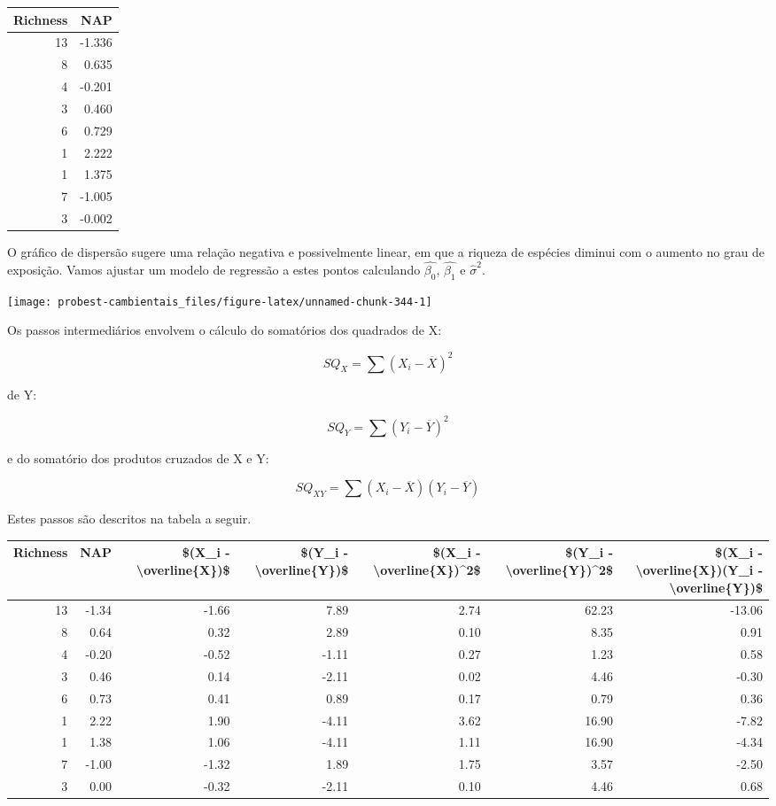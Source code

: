 \documentclass[
]{book}
\begin{document}
\begin{tabular}{r|r}
\hline
Richness & NAP\\
\hline
13 & -1.336\\
\hline
8 & 0.635\\
\hline
4 & -0.201\\
\hline
3 & 0.460\\
\hline
6 & 0.729\\
\hline
1 & 2.222\\
\hline
1 & 1.375\\
\hline
7 & -1.005\\
\hline
3 & -0.002\\
\hline
\end{tabular}

O gráfico de dispersão sugere uma relação negativa e possivelmente linear, em que a riqueza de espécies diminui com o aumento no grau de exposição. Vamos ajustar um modelo de regressão a estes pontos calculando \(\hat{\beta_0}\), \(\hat{\beta_1}\) e \(\hat{\sigma}^2\).

\begin{center}\texttt{[image: probest-cambientais\_files/figure-latex/unnamed-chunk-344-1]} \end{center}

Os passos intermediários envolvem o cálculo do somatórios dos quadrados de X:

\[SQ_X = \sum{(X_i - \overline{X})^2}\]

de Y:

\[SQ_Y = \sum{(Y_i - \overline{Y})^2}\]

e do somatório dos produtos cruzados de X e Y:

\[SQ_{XY} = \sum{(X_i - \overline{X}) (Y_i - \overline{Y})}\]

Estes passos são descritos na tabela a seguir.

\begin{tabular}{r|r|r|r|r|r|r}
\hline
Richness & NAP & \$(X\_i - \textbackslash{}overline\{X\})\$ & \$(Y\_i - \textbackslash{}overline\{Y\})\$ & \$(X\_i - \textbackslash{}overline\{X\})\textasciicircum{}2\$ & \$(Y\_i - \textbackslash{}overline\{Y\})\textasciicircum{}2\$ & \$(X\_i - \textbackslash{}overline\{X\})(Y\_i - \textbackslash{}overline\{Y\})\$\\
\hline
13 & -1.34 & -1.66 & 7.89 & 2.74 & 62.23 & -13.06\\
\hline
8 & 0.64 & 0.32 & 2.89 & 0.10 & 8.35 & 0.91\\
\hline
4 & -0.20 & -0.52 & -1.11 & 0.27 & 1.23 & 0.58\\
\hline
3 & 0.46 & 0.14 & -2.11 & 0.02 & 4.46 & -0.30\\
\hline
6 & 0.73 & 0.41 & 0.89 & 0.17 & 0.79 & 0.36\\
\hline
1 & 2.22 & 1.90 & -4.11 & 3.62 & 16.90 & -7.82\\
\hline
1 & 1.38 & 1.06 & -4.11 & 1.11 & 16.90 & -4.34\\
\hline
7 & -1.00 & -1.32 & 1.89 & 1.75 & 3.57 & -2.50\\
\hline
3 & 0.00 & -0.32 & -2.11 & 0.10 & 4.46 & 0.68\\
\hline
\end{tabular}
\end{document}
